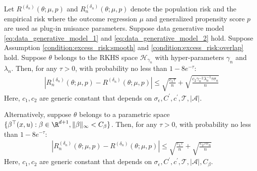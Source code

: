 \begin{lemma}\label{lemma:concentration_risk} Let $R^{({\delta_n})}(\theta;\mu,p)$ and $R_n^{({\delta_n})}(\theta;\mu,p)$
denote the population risk and the empirical risk where the outcome regression $\mu$ and generalized propensity score $p$ are used as plug-in nuisance parameters. Suppose data generative model \eqref{eq:data_generative_model_1} and \eqref{eq:data_generative_model_2} hold. Suppose Assumption \ref{condition:excess_risk:smooth} and \ref{condition:excess_risk:overlap} hold. Suppose $\theta$ belongs to the RKHS space $\mathcal{H}_{\gamma_n}$ with hyper-parameters $\gamma_n$ and $\lambda_n$. Then, for any $\tau>0$, with probability no less than $1-8e^{-\tau}$:
\begin{align*}
    &\left|R_n^{({\delta_n})}(\theta;\mu, p)-R^{({\delta_n})}(\theta;\mu, p)\right|\leq \sqrt{\frac{c_1\tau}{n}}+
    \sqrt{\frac{ c_2\gamma_n^{-2}\lambda_n^{-1}\tau\sigma_n}{n}} 
\end{align*}
Here, $c_1,c_2$ are generic constant that depends on $\sigma_\epsilon,C^\prime,c^\prime,\mathcal{T},|\mathcal{A}|$.

Alternatively, suppose $\theta$ belongs to a parametric space $\{\beta^\top(x,u):\beta\in\R^{d+1},\|\beta\|_\infty<C_\beta\}$. Then, for any $\tau>0$, with probability no less than $1-8e^{-\tau}$:
\begin{align*}
    &\left|R_n^{({\delta_n})}(\theta;\mu, p)-R^{({\delta_n})}(\theta;\mu, p)\right|\leq \sqrt{\frac{c_1\tau}{n}}+
    \sqrt{\frac{ c_2\tau\sigma_n}{n}} 
\end{align*}
Here, $c_1,c_2$ are generic constant that depends on $\sigma_\epsilon,C^\prime,c^\prime,\mathcal{T},|\mathcal{A}|,C_\beta$.
    
\end{lemma}
